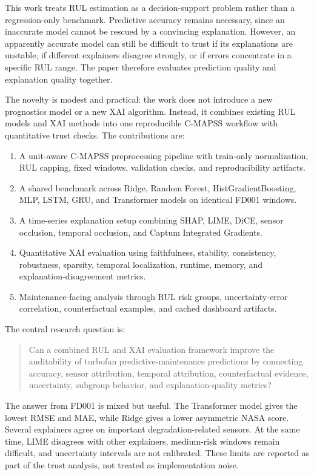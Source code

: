 \documentclass[conference]{IEEEtran}
\begin{document}
This work treats RUL estimation as a decision-support problem rather than a regression-only benchmark. Predictive accuracy remains necessary, since an inaccurate model cannot be rescued by a convincing explanation. However, an apparently accurate model can still be difficult to trust if its explanations are unstable, if different explainers disagree strongly, or if errors concentrate in a specific RUL range. The paper therefore evaluates prediction quality and explanation quality together.

The novelty is modest and practical: the work does not introduce a new prognostics model or a new XAI algorithm. Instead, it combines existing RUL models and XAI methods into one reproducible C-MAPSS workflow with quantitative trust checks. The contributions are:
\begin{enumerate}
\item A unit-aware C-MAPSS preprocessing pipeline with train-only normalization, RUL capping, fixed windows, validation checks, and reproducibility artifacts.
\item A shared benchmark across Ridge, Random Forest, HistGradientBoosting, MLP, LSTM, GRU, and Transformer models on identical FD001 windows.
\item A time-series explanation setup combining SHAP, LIME, DiCE, sensor occlusion, temporal occlusion, and Captum Integrated Gradients.
\item Quantitative XAI evaluation using faithfulness, stability, consistency, robustness, sparsity, temporal localization, runtime, memory, and explanation-disagreement metrics.
\item Maintenance-facing analysis through RUL risk groups, uncertainty-error correlation, counterfactual examples, and cached dashboard artifacts.
\end{enumerate}

The central research question is:
\begin{quote}
Can a combined RUL and XAI evaluation framework improve the auditability of turbofan predictive-maintenance predictions by connecting accuracy, sensor attribution, temporal attribution, counterfactual evidence, uncertainty, subgroup behavior, and explanation-quality metrics?
\end{quote}

The answer from FD001 is mixed but useful. The Transformer model gives the lowest RMSE and MAE, while Ridge gives a lower asymmetric NASA score. Several explainers agree on important degradation-related sensors. At the same time, LIME disagrees with other explainers, medium-risk windows remain difficult, and uncertainty intervals are not calibrated. These limits are reported as part of the trust analysis, not treated as implementation noise.
\end{document}
